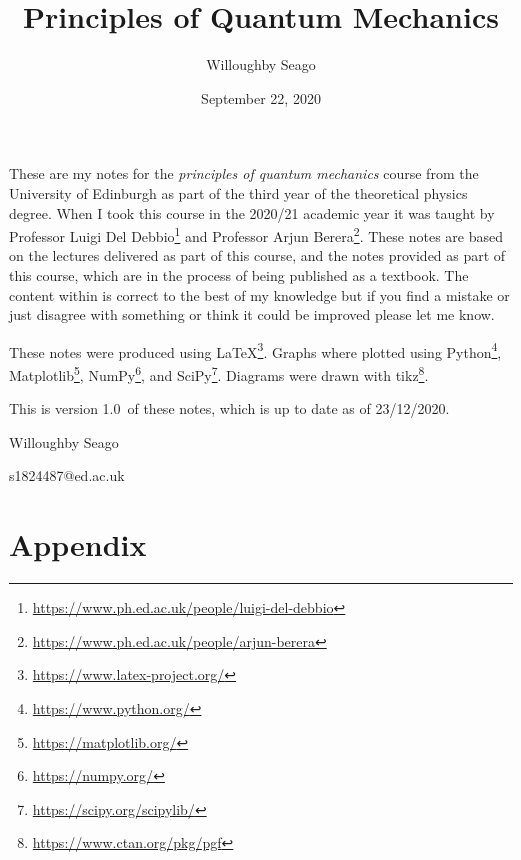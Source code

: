 \documentclass[a4paper]{article}
\author{Willoughby Seago}
\date{September 22, 2020}
\title{Principles of Quantum Mechanics}
\newcommand{\notesVersion}{1.0}
\newcommand{\notesDate}{23/12/2020}
\begin{document}
    \maketitle
    These are my notes for the \textit{principles of quantum mechanics} course from the University of Edinburgh as part of the third year of the theoretical physics degree.
    When I took this course in the 2020/21 academic year it was taught by Professor Luigi Del Debbio\footnote{\url{https://www.ph.ed.ac.uk/people/luigi-del-debbio}} and Professor Arjun Berera\footnote{\url{https://www.ph.ed.ac.uk/people/arjun-berera}}.
    These notes are based on the lectures delivered as part of this course, and the notes provided as part of this course, which are in the process of being published as a textbook.
    The content within is correct to the best of my knowledge but if you find a mistake or just disagree with something or think it could be improved please let me know.
    
    These notes were produced using \LaTeX\footnote{\url{https://www.latex-project.org/}}.
    Graphs where plotted using Python\footnote{\url{https://www.python.org/}}, Matplotlib\footnote{\url{https://matplotlib.org/}}, NumPy\footnote{\url{https://numpy.org/}}, and SciPy\footnote{\url{https://scipy.org/scipylib/}}.
    Diagrams were drawn with tikz\footnote{\url{https://www.ctan.org/pkg/pgf}}.
    
    This is version \notesVersion~of these notes, which is up to date as of \notesDate.
    \begin{flushright}
        Willoughby Seago
        
        s1824487@ed.ac.uk
    \end{flushright}
    \clearpage
    \tableofcontents
    \listoffigures
    \listoftables
    \printglossary[type=\acronymtype, title=Acronyms, style=long]
    \clearpage
    \begingroup
    \let\clearpage\relax  %
    
    
    
    
    
    
    
    \endgroup
    

    
    \tikzexternaldisable
    
   \clearpage
   \appendix
   \part*{Appendix}
   \begingroup
   \let\newpage\relax
   
   
   
   
   \endgroup
\end{document}
